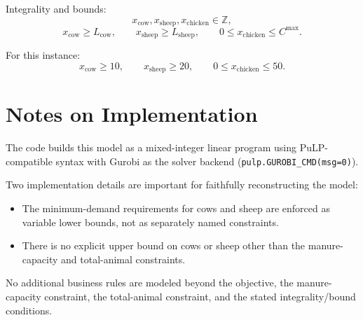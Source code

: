 Integrality and bounds:
\[
x_{\mathrm{cow}},x_{\mathrm{sheep}},x_{\mathrm{chicken}} \in \mathbb{Z},
\]
\[
x_{\mathrm{cow}} \ge L_{\mathrm{cow}},\qquad
x_{\mathrm{sheep}} \ge L_{\mathrm{sheep}},\qquad
0 \le x_{\mathrm{chicken}} \le C^{\max}.
\]

For this instance:
\[
x_{\mathrm{cow}} \ge 10,\qquad x_{\mathrm{sheep}} \ge 20,\qquad 0 \le x_{\mathrm{chicken}} \le 50.
\]

\section*{Notes on Implementation}

The code builds this model as a mixed-integer linear program using PuLP-compatible syntax with Gurobi as the solver backend (\texttt{pulp.GUROBI\_CMD(msg=0)}).

Two implementation details are important for faithfully reconstructing the model:

\begin{itemize}
\item The minimum-demand requirements for cows and sheep are enforced as variable lower bounds, not as separately named constraints.
\item There is no explicit upper bound on cows or sheep other than the manure-capacity and total-animal constraints.
\end{itemize}

No additional business rules are modeled beyond the objective, the manure-capacity constraint, the total-animal constraint, and the stated integrality/bound conditions.
